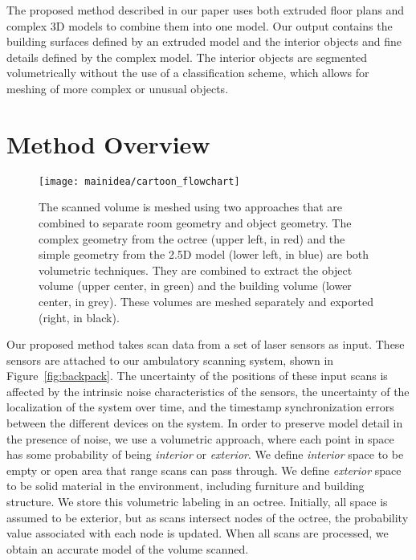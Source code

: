 \documentclass[review]{acmsiggraph}
\begin{document}
The proposed method described in our paper uses both extruded floor plans and complex 3D models to combine them into one model.  Our output contains the building surfaces defined by an extruded model and the interior objects and fine details defined by the complex model.  The interior objects are segmented volumetrically without the use of a classification scheme, which allows for meshing of more complex or unusual objects.

\section{Method Overview}
\label{sec:overview}

\begin{figure}[t]
	\centerline{\texttt{[image: mainidea/cartoon\_flowchart]}}
	\caption{The scanned volume is meshed using two approaches that are combined to separate room geometry and object geometry.  The complex geometry from the octree (upper left, in red) and the simple geometry from the 2.5D model (lower left, in blue) are both volumetric techniques.  They are combined to extract the object volume (upper center, in green) and the building volume (lower center, in grey).  These volumes are meshed separately and exported (right, in black).}
	\label{fig:mainidea}
\end{figure}

Our proposed method takes scan data from a set of laser sensors as input.  These sensors are attached to our ambulatory scanning system, shown in Figure~\ref{fig:backpack}.  The uncertainty of the positions of these input scans is affected by the intrinsic noise characteristics of the sensors, the uncertainty of the localization of the system over time, and the timestamp synchronization errors between the different devices on the system.  In order to preserve model detail in the presence of noise, we use a volumetric approach, where each point in space has some probability of being {\it interior} or {\it exterior}.  We define {\it interior} space to be empty or open area that range scans can pass through.  We define {\it exterior} space to be solid material in the environment, including furniture and building structure.  We store this volumetric labeling in an octree.  Initially, all space is assumed to be exterior, but as scans intersect nodes of the octree, the probability value associated with each node is updated.  When all scans are processed, we obtain an accurate model of the volume scanned.
\end{document}
